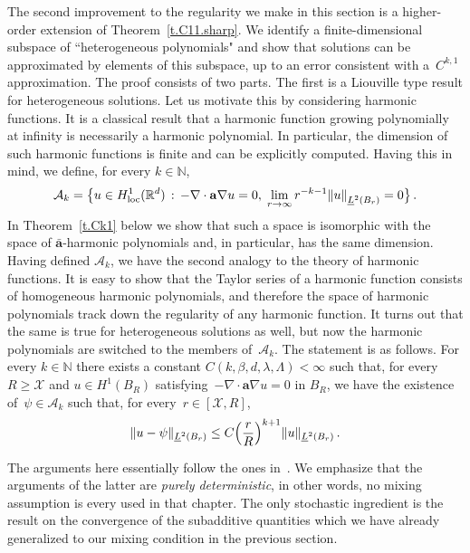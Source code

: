 \documentclass[11pt]{article} %
\numberwithin{equation}{section}
\theoremstyle{definition}
\let\originalleft\left
\let\originalright\right
\renewcommand{\left}{\mathopen{}\mathclose\bgroup\originalleft}
\renewcommand{\right}{\aftergroup\egroup\originalright}
\newcommand*{\N}{\ensuremath{\mathbb{N}}}
\newcommand*{\R}{\ensuremath{\mathbb{R}}}
\renewcommand{\a}{\mathbf{a}}
\newcommand{\ahom}{\bar{\a}}
\newcommand{\X}{\mathcal{X}}
\begin{document}
The second improvement to the regularity we make in this section is a higher-order extension of  Theorem~\ref{t.C11.sharp}. We identify a finite-dimensional subspace of ``heterogeneous polynomials" and show that solutions can be approximated by elements of this subspace, up to an error consistent with a~$C^{k,1}$ approximation. The proof consists of two parts. The first is a Liouville type result for heterogeneous solutions. Let us motivate this by considering harmonic functions. It is a classical result that a harmonic function growing polynomially at infinity is necessarily a harmonic polynomial. In particular, the dimension of such harmonic functions is finite and can be explicitly computed. Having this in mind, we define, for every $k \in \N$, 
\begin{equation*}  
\mathcal{A}_k  = \big\{ u \in H^1_{\mathrm{loc}}(\R^d) \, : \, -\nabla \cdot \a \nabla u = 0, \; \lim_{r\to \infty} r^{-k-1} \left\| u \right\|_{\underline{L}^2 \left( B_{r} \right)} = 0  \big\} \,.
\end{equation*}
In Theorem~\ref{t.Ck1} below we show that such a space is isomorphic with the space of $\ahom$-harmonic polynomials and, in particular, has the same dimension. Having defined $\mathcal{A}_k$, we have the second analogy to the theory of harmonic functions. It is easy to show that the Taylor series of a harmonic  function consists of homogeneous harmonic polynomials, and therefore the space of harmonic polynomials track down the regularity of any harmonic function. It turns out that the same is true for heterogeneous solutions as well, but now the harmonic polynomials are switched to the members of~$\mathcal{A}_k$. The statement is as follows. For every $k \in \N$ there exists a constant $C(k,\beta,d,\lambda,\Lambda)<\infty$ such that, for every $R\geq \X$ and $u\in H^1(B_R)$ satisfying~$-\nabla \cdot \a\nabla u = 0$ in $B_R$, we have the existence of~$\psi \in \mathcal{A}_k$ such that, for every~$r \in [\X,R]$, 
\begin{equation*}  
\| u - \psi \|_{\underline{L}^2(B_r)} \leq C \Bigl(\frac rR \Bigr)^{k+1} \| u \|_{\underline{L}^2(B_r)}  \,.
\end{equation*}

\smallskip

The arguments here essentially follow the ones in~\cite[Chapter 3]{AKMBook}. We emphasize that the arguments of the latter are \emph{purely deterministic}, in other words, no mixing assumption is every used in that chapter. The only stochastic ingredient is the result on the convergence of the subadditive quantities which we have already generalized to our mixing condition in the previous section. 
\end{document}
